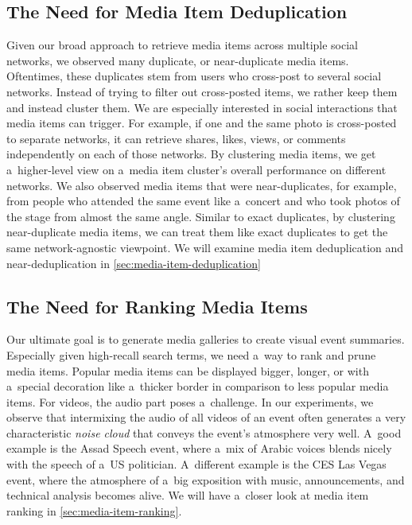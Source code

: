 \subsection{The Need for Media Item Deduplication}
\label{sec:the-need-for-media-item-deduplication}

Given our broad approach to retrieve media items
across multiple social networks,
we observed many duplicate, or near-duplicate media items.
Oftentimes, these duplicates stem from users who
cross-post to several social networks.
Instead of trying to filter out cross-posted items,
we rather keep them and instead cluster them.
We are especially interested in social interactions
that media items can trigger.
For example, if one and the same photo
is cross-posted to separate networks,
it can retrieve shares, likes, views, or comments
independently on each of those networks.
By clustering media items, we get a~higher-level view on
a~media item cluster's overall performance on different networks.
We also observed media items that were near-duplicates,
for example, from people who attended the same event like a~concert
and who took photos of the stage from almost the same angle.
Similar to exact duplicates,
by clustering near-duplicate media items,
we can treat them like exact duplicates to get the same
network-agnostic viewpoint.
We will examine media item deduplication and near-deduplication
in \autoref{sec:media-item-deduplication}

\subsection{The Need for Ranking Media Items}

Our ultimate goal is to generate media galleries
to create visual event summaries.
Especially given high-recall search terms,
we need a~way to rank and prune media items.
Popular media items can be displayed bigger, longer,
or with a~special decoration like a~thicker border
in comparison to less popular media items.
For videos, the audio part poses a~challenge.
In our experiments, we observe that intermixing the audio
of all videos of an event often generates
a very characteristic \emph{noise cloud}
that conveys the event's atmosphere very well.
A~good example is the Assad Speech event,
where a~mix of Arabic voices blends nicely
with the speech of a~US politician.
A~different example is the CES Las Vegas event,
where the atmosphere of a~big exposition with music,
announcements, and technical analysis becomes alive.
We will have a~closer look at media item ranking in
\autoref{sec:media-item-ranking}.

